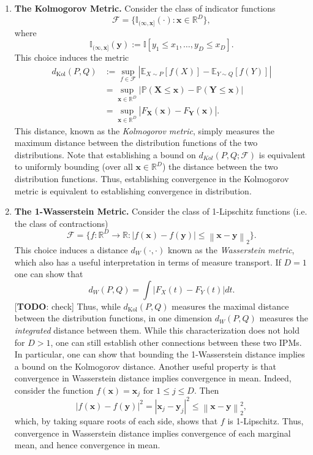 \documentclass[12pt]{article}
\newcommand*{\abs}[1]{\left\lvert#1\right\rvert}
\newcommand{\R}{\mathbb{R}}
\newcommand{\indicator}[1]{\mathbb{I}[#1]}
\newcommand{\indicatorSub}[1]{\mathbb{I}_{#1}} %
\newcommand*{\norm}[1]{\left\lVert#1\right\rVert}
\newcommand{\bx}{\mathbf{x}}
\newcommand{\by}{\mathbf{y}}
\newcommand{\bX}{\mathbf{X}}
\newcommand{\bY}{\mathbf{Y}}
\newcommand{\E}{\mathbb{E}}
\newcommand{\Prob}{\mathbb{P}}
\newcommand{\CDF}{F}
\newcommand{\IPMClass}{\mathcal{F}} %
\newcommand{\fIPM}{f} %
\newcommand{\dist}{P}
\newcommand{\distApprox}{Q}
\newcommand{\metric}{d}
\newcommand{\Dim}{D}
\begin{document}
\begin{enumerate}
\item \textbf{The Kolmogorov Metric.} Consider the class of indicator functions 
\[
 \IPMClass = \{\indicatorSub{(\infty, \bx]}(\cdot) : \bx \in \R^{\Dim} \},
\]
where 
\[
\indicatorSub{(\infty, \bx]}(\by) := \indicator{y_1 \leq x_1, \dots, y_{\Dim} \leq x_{\Dim}}.
\]
This choice induces the metric 
\begin{align*}
\metric_{\text{Kol}}(\dist, \distApprox) 
&:= \sup_{\fIPM \in \IPMClass} \abs{\E_{X \sim P}\left[\fIPM(X)\right] - \E_{Y \sim Q}\left[\fIPM(Y)\right] } \\
&= \sup_{\bx \in \R^{\Dim}} \abs{\Prob(\bX \leq \bx) - \Prob(\bY \leq \bx) } \\
&= \sup_{\bx \in \R^{\Dim}} \abs{\CDF_{\bX}(\bx) - \CDF_{\bY}(\bx) }.
\end{align*}
This distance, known as the \textit{Kolmogorov metric}, simply measures the maximum distance between the distribution functions of the two distributions. 
Note that establishing a bound on $\metric_{Kol}(\dist, \distApprox; \IPMClass)$ is equivalent to uniformly bounding (over all $\bx \in \R^{\Dim}$) the distance between 
the two distribution functions. Thus, establishing convergence in the Kolmogorov metric is equivalent to establishing convergence in distribution. 

\item \textbf{The 1-Wasserstein Metric.} Consider the class of 1-Lipschitz functions (i.e. the class of contractions) 
\[
 \IPMClass = \{\fIPM: \R^{\Dim} \to \R : \abs{\fIPM(\bx) - \fIPM(\by)} \leq \norm{\bx - \by}_{2} \}.
\]
This choice induces a distance $\metric_W(\cdot, \cdot)$ known as the \textit{Wasserstein metric}, which also has a useful interpretation in terms of measure transport. If $\Dim = 1$ one can show that 
\[
\metric_W(\dist, \distApprox) = \int \abs{\CDF_X(t) - \CDF_Y(t)} dt.
\]
[\textbf{TODO}: check]
Thus, while $\metric_{\text{Kol}}(\dist, \distApprox)$ measures the maximal distance between the distribution functions, in one dimension $\metric_W(\dist, \distApprox)$ measures the \textit{integrated} 
distance between them. While this characterization does not hold for $\Dim > 1$, one can still establish other connections between these two IPMs. In particular, one can show that bounding 
the 1-Wasserstein distance implies a bound on the Kolmogorov distance. Another useful property is that convergence in Wasserstein distance implies convergence in mean. Indeed, consider the function
$\fIPM(\bx) = \bx_j$ for $1 \leq j \leq \Dim$. Then 
\[
\abs{\fIPM(\bx) - \fIPM(\by)}^2 = \abs{\bx_j - \by_j}^2 \leq \norm{\bx - \by}_2^2,
\]
which, by taking square roots of each side, shows that $\fIPM$ is 1-Lipschitz. Thus, convergence in Wasserstein distance implies convergence of each marginal mean, and hence convergence in mean. 


\end{enumerate}
\end{document}
